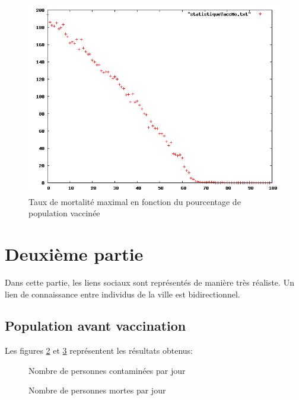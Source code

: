 \documentclass[12pt,a4paper,titlepage]{report}
\begin{document}
 \begin{figure}[h]
  \centering
  \includegraphics[width=15cm]{1-2-statistiqueMo.png}
  \caption{Taux de mortalité maximal en fonction du pourcentage de population vaccinée}
  \label{fig:1-2-nb-morts}
\end{figure}




\section*{Deuxième partie}
Dans cette partie, les liens sociaux sont représentés de manière très réaliste. Un lien de 
connaissance entre individus de la ville est bidirectionnel.  
\subsection*{Population avant vaccination}
Les figures \ref{fig:2-1-nb-malades} et \ref{fig:2-1-nb-morts} représentent les résultats obtenus:
\begin{figure}[h]
  \centering
  \caption{Nombre de personnes contaminées par jour}
  \label{fig:2-1-nb-malades}
\end{figure}

\begin{figure}[h]
  \centering
  \caption{Nombre de personnes mortes par jour}
  \label{fig:2-1-nb-morts}
\end{figure}
\end{document}
